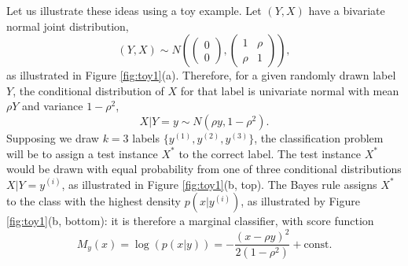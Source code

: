 \documentclass[twoside,11pt]{article}
\begin{document}
Let us illustrate these ideas using a toy example.  Let $(Y, X)$ have
a bivariate normal joint distribution,
\[
(Y, X) \sim N\left(\begin{pmatrix}0 \\0\end{pmatrix}, \begin{pmatrix}1 & \rho \\ \rho & 1\end{pmatrix}\right),
\]
as illustrated in Figure \ref{fig:toy1}(a).  Therefore, for a given
randomly drawn label $Y$, the conditional
distribution of $X$ for that label is univariate normal with mean $\rho Y$ and variance $1-\rho^2$,
\[
X|Y = y \sim N(\rho y, 1-\rho^2).
\]
Supposing we draw $k = 3$ labels $\{y^{(1)},y^{(2)}, y^{(3)}\}$, the classification
problem will be to assign a test instance $X^*$ to the correct label.
The test instance $X^*$ would be drawn with equal probability from one
of three conditional distributions $ X | Y=y^{(i)}$, as illustrated in
Figure \ref{fig:toy1}(b, top).  The Bayes rule assigns $X^*$ to the
class with the highest density $p(x|y^{(i)})$, as illustrated by Figure
\ref{fig:toy1}(b, bottom): it is therefore a marginal classifier, with
score function
\[
M_y(x) = \log(p(x|y)) = -\frac{(x - \rho y)^2}{2(1-\rho^2)}  + \text{const.}
\] %

\end{document}

